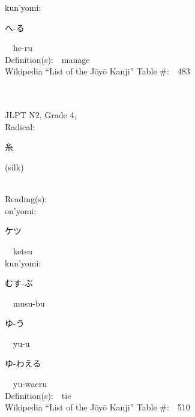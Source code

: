\begin{multicols}{2}
{\hspace*{1em}}kun'yomi:\ \ \\
{\hspace*{2em}}{\begin{CJK}{UTF8}{min} へ-る \end{CJK}}\ \ he-ru\ \ \\
Definition(s):\ \ manage \\
Wikipedia ``List of the J\=oy\=o Kanji'' Table \#:\ \ 483 \\
\ \ \\
{\fontsize{34pt}{40pt}  }\ \ \\  %
{JLPT N2, Grade 4, \\Radical:\ \ {\begin{CJK}{UTF8}{min} 糸 \end{CJK}} (silk) } \\
Reading(s):\ \ \\
{\hspace*{1em}}on'yomi:\ \ \\
{\hspace*{2em}}{\begin{CJK}{UTF8}{min} ケツ \end{CJK}}\ \ ketsu\ \ \\
{\hspace*{1em}}kun'yomi:\ \ \\
{\hspace*{2em}}{\begin{CJK}{UTF8}{min} むす-ぶ \end{CJK}}\ \ musu-bu\ \ \\
{\hspace*{2em}}{\begin{CJK}{UTF8}{min} ゆ-う \end{CJK}}\ \ yu-u\ \ \\
{\hspace*{2em}}{\begin{CJK}{UTF8}{min} ゆ-わえる \end{CJK}}\ \ yu-waeru\ \ \\
Definition(s):\ \ tie \\
Wikipedia ``List of the J\=oy\=o Kanji'' Table \#:\ \ 510 \\
\ \ \\
{\fontsize{34pt}{40pt}  }\ \ \\  %

\end{multicols}
